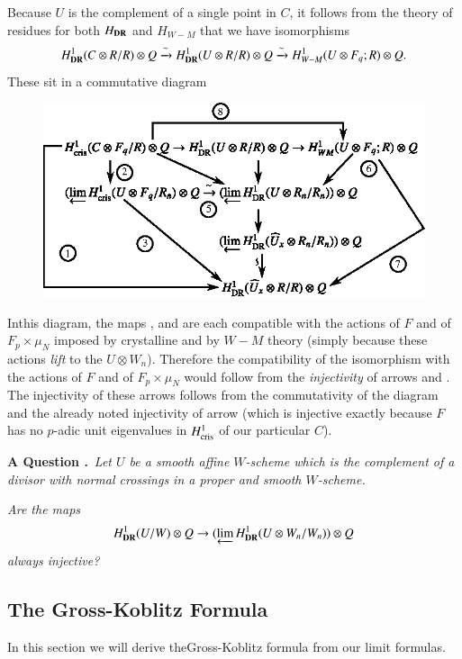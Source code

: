Because $U$ is the complement of a single point in $C$, it follows from the theory of residues for both $H_{\mathbf{DR}}$ and $H_{W-M}$ that we have isomorphisms
$$
H^{1}_{\mathbf{DR}}(C\otimes R/R)\otimes Q\xrightarrow{\sim}H^{1}_{\mathbf{DR}}(U\otimes R/R)\otimes Q\xrightarrow{\sim}H^{1}_{W-M}(U\otimes F_{q};R)\otimes Q.
$$
These sit in a commutative diagram
\begin{figure}[H]
\centering
\includegraphics{chap6/fig16.eps}
\end{figure}

In\pageoriginale this diagram, the maps ,  and  are each compatible with the actions of $F$ and of $F_{p}\times \mu_{N}$ imposed by crystalline and by $W-M$ theory (simply because these actions {\em lift} to the $U\otimes W_{n}$). Therefore the compatibility of the isomorphism  with the actions of $F$ and of $F_{p}\times \mu_{N}$ would follow from the {\em injectivity} of arrows  and . The injectivity of these arrows follows from the commutativity of the diagram and the already noted injectivity of arrow  (which is injective exactly because $F$ has no $p$-adic unit eigenvalues in $H^{1}_{\operatorname{cris}}$ of our particular $C$).

\medskip
\noindent
{\bf A Question .\label{art6-7.8.2}}~{\em Let $U$ be a smooth affine $W$-scheme which is the complement of a divisor with normal crossings in a proper and smooth $W$-scheme.}

{\em Are the maps}
$$
H^{1}_{\mathbf{DR}}(U/W)\otimes Q\to (\varprojlim H^{1}_{\mathbf{DR}}(U\otimes W_{n}/W_{n}))\otimes Q
$$
{\em always injective?}

\setcounter{section}{7}
\setcounter{subsection}{8}
\subsection{The Gross-Koblitz Formula}\label{art6-sec7.9}
In this section we will derive the\break Gross-Koblitz formula from our limit formulas.

